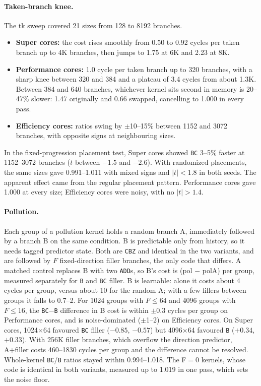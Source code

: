 \documentclass[10pt]{article}
\begin{document}
\paragraph{Taken-branch knee.} The tk sweep covered 21 sizes from 128 to 8192 branches.
\begin{itemize}
  \item \textbf{Super cores:} the cost rises smoothly from 0.50 to 0.92 cycles per taken
        branch up to 4K branches, then jumps to 1.75 at 6K and 2.23 at 8K.
  \item \textbf{Performance cores:} 1.0 cycle per taken branch up to 320 branches, with a
        sharp knee between 320 and 384 and a plateau of 3.4 cycles from about 1.3K.
        Between 384 and 640 branches, whichever kernel sits second in memory is 20--47\%
        slower: 1.47 originally and 0.66 swapped, cancelling to 1.000 in every pass.
  \item \textbf{Efficiency cores:} ratios swing by $\pm$10--15\% between 1152 and 3072
        branches, with opposite signs at neighbouring sizes.
\end{itemize}
In the fixed-progression placement test, Super cores showed \texttt{BC} 3--5\% faster at
1152--3072 branches ($t$ between $-1.5$ and $-2.6$). With randomized placements, the same
sizes gave 0.991--1.011 with mixed signs and $|t|<1.8$ in both seeds. The apparent
effect came from the regular placement pattern. Performance cores gave 1.000 at every
size; Efficiency cores were noisy, with no $|t|>1.4$.

\paragraph{Pollution.} Each group of a pollution kernel holds a random branch A,
immediately followed by a branch B on the same condition. B is predictable only from
history, so it needs tagged predictor state. Both are \texttt{CBZ} and identical in the
two variants, and are followed by $F$ fixed-direction filler branches, the only code that
differs. A matched control replaces B with two \texttt{ADD}s, so B's cost is
(pol $-$ polA) per group, measured separately for \texttt{B} and \texttt{BC} filler.
B is learnable: alone it costs about 4 cycles per group, versus about 10 for the random
A; with a few fillers between groups it falls to 0.7--2. For 1024 groups with
$F \le 64$ and 4096 groups with $F \le 16$, the \texttt{BC}$-$\texttt{B} difference in B
cost is within $\pm$0.3 cycles per group on Performance cores, and is noise-dominated
($\pm$1--2) on Efficiency cores. On Super cores, 1024$\times$64 favoured \texttt{BC}
filler ($-0.85$, $-0.57$) but 4096$\times$64 favoured \texttt{B} ($+0.34$, $+0.33$). With
256K filler branches, which overflow the direction predictor, A+filler costs
460--1830 cycles per group and the difference cannot be resolved. Whole-kernel
\texttt{BC}/\texttt{B} ratios stayed within 0.994--1.018. The F$=$0 kernels, whose code is
identical in both variants, measured up to 1.019 in one pass, which sets the noise floor.
\end{document}
